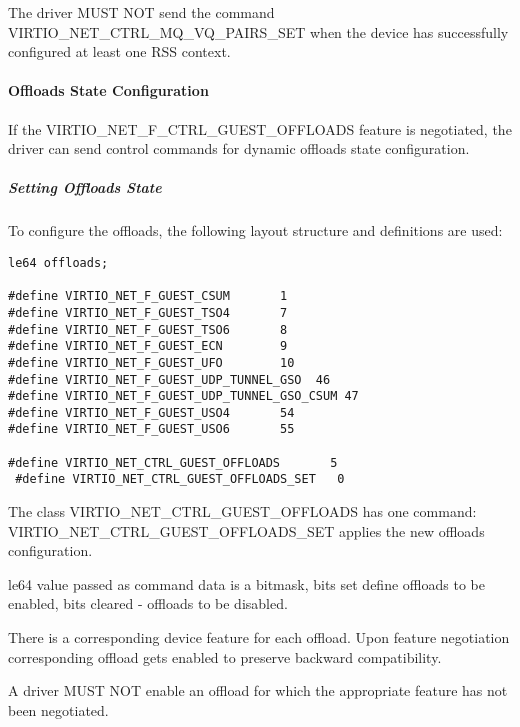 The driver MUST NOT send the command VIRTIO_NET_CTRL_MQ_VQ_PAIRS_SET when the device has successfully configured at least one RSS context.

\paragraph{Offloads State Configuration}\label{sec:Device Types / Network Device / Device Operation / Control Virtqueue / Offloads State Configuration}

If the VIRTIO_NET_F_CTRL_GUEST_OFFLOADS feature is negotiated, the driver can
send control commands for dynamic offloads state configuration.

\subparagraph{Setting Offloads State}\label{sec:Device Types / Network Device / Device Operation / Control Virtqueue / Offloads State Configuration / Setting Offloads State}

To configure the offloads, the following layout structure and
definitions are used:

\begin{lstlisting}
le64 offloads;

#define VIRTIO_NET_F_GUEST_CSUM       1
#define VIRTIO_NET_F_GUEST_TSO4       7
#define VIRTIO_NET_F_GUEST_TSO6       8
#define VIRTIO_NET_F_GUEST_ECN        9
#define VIRTIO_NET_F_GUEST_UFO        10
#define VIRTIO_NET_F_GUEST_UDP_TUNNEL_GSO  46
#define VIRTIO_NET_F_GUEST_UDP_TUNNEL_GSO_CSUM 47
#define VIRTIO_NET_F_GUEST_USO4       54
#define VIRTIO_NET_F_GUEST_USO6       55

#define VIRTIO_NET_CTRL_GUEST_OFFLOADS       5
 #define VIRTIO_NET_CTRL_GUEST_OFFLOADS_SET   0
\end{lstlisting}

The class VIRTIO_NET_CTRL_GUEST_OFFLOADS has one command:
VIRTIO_NET_CTRL_GUEST_OFFLOADS_SET applies the new offloads configuration.

le64 value passed as command data is a bitmask, bits set define
offloads to be enabled, bits cleared - offloads to be disabled.

There is a corresponding device feature for each offload. Upon feature
negotiation corresponding offload gets enabled to preserve backward
compatibility.


A driver MUST NOT enable an offload for which the appropriate feature
has not been negotiated.

